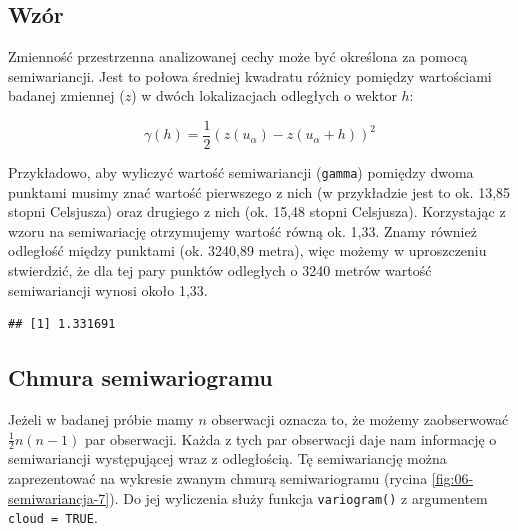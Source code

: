 \documentclass[
  paper=6in:9in,pagesize=pdftex,headinclude=on,footinclude=on,10pt]{scrbook}
\newenvironment{Shaded}{\begin{snugshade}}{\end{snugshade}}
\newcommand{\DecValTok}[1]{\textcolor[rgb]{0.00,0.00,0.81}{#1}}
\newcommand{\FloatTok}[1]{\textcolor[rgb]{0.00,0.00,0.81}{#1}}
\newcommand{\FunctionTok}[1]{\textcolor[rgb]{0.13,0.29,0.53}{\textbf{#1}}}
\newcommand{\NormalTok}[1]{#1}
\newcommand{\OtherTok}[1]{\textcolor[rgb]{0.56,0.35,0.01}{#1}}
\newcommand{\SpecialCharTok}[1]{\textcolor[rgb]{0.81,0.36,0.00}{\textbf{#1}}}
\begin{document}
\subsection{Wzór}\label{wzuxf3r}

Zmienność przestrzenna analizowanej cechy może być określona za pomocą semiwariancji.
Jest to połowa średniej kwadratu różnicy pomiędzy wartościami badanej zmiennej (\(z\)) w dwóch lokalizacjach odległych o wektor \(h\):

\[\gamma(h) = \frac{1}{2}(z(u_{\alpha}) - z(u_{\alpha} + h))^2\]

Przykładowo, aby wyliczyć wartość semiwariancji (\texttt{gamma}) pomiędzy dwoma punktami musimy znać wartość pierwszego z nich (w przykładzie jest to ok. 13,85 stopni Celsjusza) oraz drugiego z nich (ok. 15,48 stopni Celsjusza).
Korzystając z wzoru na semiwariację otrzymujemy wartość równą ok. 1,33.
Znamy również odległość między punktami (ok. 3240,89 metra), więc możemy w uproszczeniu stwierdzić, że dla tej pary punktów odległych o 3240 metrów wartość semiwariancji wynosi około 1,33.

\begin{Shaded}
\end{Shaded}

\begin{verbatim}
## [1] 1.331691
\end{verbatim}

\subsection{Chmura semiwariogramu}\label{chmura-semiwariogramu}

Jeżeli w badanej próbie mamy \(n\) obserwacji oznacza to, że możemy zaobserwować \(\frac{1}{2}n(n-1)\) par obserwacji.
Każda z tych par obserwacji daje nam informację o semiwariancji występującej wraz z odległością.
Tę semiwariancję można zaprezentować na wykresie zwanym chmurą semiwariogramu (rycina \ref{fig:06-semiwariancja-7}).
Do jej wyliczenia służy funkcja \texttt{variogram()} z argumentem \texttt{cloud\ =\ TRUE}.
\end{document}
